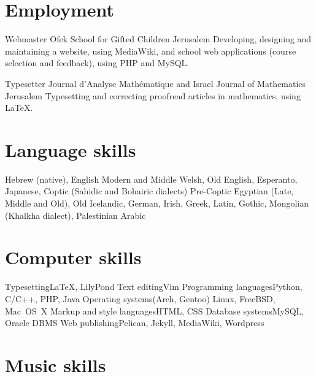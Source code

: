 \section{Employment}

	{Webmaster}
	{Ofek School for Gifted Children}
	{Jerusalem}
	{}
	{Developing, designing and maintaining a website, using MediaWiki, and school web applications (course selection and feedback), using PHP and MySQL.}

	{Typesetter}
	{Journal d’Analyse Mathématique and Israel Journal of Mathematics}
	{Jerusalem}
	{}
	{Typesetting and correcting proofread articles in mathematics, using \LaTeX .}



\section{Language skills}

	{Hebrew (native), English}
	{Modern and Middle Welsh, Old English, Esperanto, Japanese, Coptic (Sahidic and Bohairic dialects)}
	{Pre-Coptic Egyptian (Late, Middle and Old), Old Icelandic, German, Irish, Greek, Latin, Gothic, Mongolian (Khalkha dialect), Palestinian Arabic}



\section{Computer skills}

\cvdoubleitem
	{Typesetting}{{\texfont\LaTeX}, LilyPond}
	{Text editing}{Vim}
\cvdoubleitem
	{Programming languages}{Python, C/C++, PHP, Java}
	{Operating systems}{(Arch, Gentoo) Linux, FreeBSD, Mac~OS~X}
\cvdoubleitem
	{Markup and style languages}{HTML, CSS}
	{Database systems}{MySQL, Oracle DBMS}
\cvdoubleitem
	{Web publishing}{Pelican, Jekyll, MediaWiki, Wordpress}
	{}{}



\section{Music skills}



